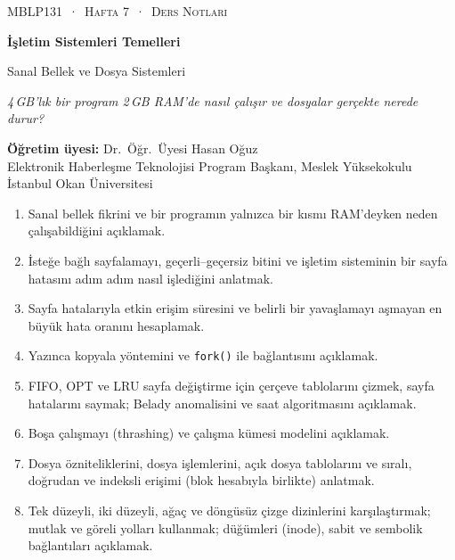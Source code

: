 \documentclass[11pt,a4paper]{article}
\newcommand{\cmd}[1]{\texttt{#1}}
\begin{document}
\thispagestyle{empty}
\begin{tcolorbox}[enhanced,colback=dark,colframe=dark,arc=0pt,boxrule=0pt,
  left=18pt,right=18pt,top=20pt,bottom=20pt,coltext=white]
{\small\color{mint}\textsc{MBLP131 \,·\, Hafta 7 \,·\, Ders Notları}}\par\medskip
{\headfont\fontsize{26}{30}\selectfont\bfseries İşletim Sistemleri Temelleri}\par\medskip
{\large Sanal Bellek ve Dosya Sistemleri}\par\smallskip
{\small\itshape\color{white!70} 4\,GB'lık bir program 2\,GB RAM'de nasıl çalışır ve dosyalar gerçekte nerede durur?}
\end{tcolorbox}

\vspace{0.4em}
\begin{minipage}[t]{0.70\linewidth}
\small
\textbf{Öğretim üyesi:} Dr.\ Öğr.\ Üyesi Hasan Oğuz\\
Elektronik Haberleşme Teknolojisi Program Başkanı, Meslek Yüksekokulu\\
İstanbul Okan Üniversitesi
\end{minipage}

\vspace{0.8em}
\begin{keyidea}
\begin{enumerate}[leftmargin=1.4em]
  \item Sanal bellek fikrini ve bir programın yalnızca bir kısmı RAM'deyken neden çalışabildiğini açıklamak.
  \item İsteğe bağlı sayfalamayı, geçerli--geçersiz bitini ve işletim sisteminin bir sayfa hatasını adım adım nasıl işlediğini anlatmak.
  \item Sayfa hatalarıyla etkin erişim süresini ve belirli bir yavaşlamayı aşmayan en büyük hata oranını hesaplamak.
  \item Yazınca kopyala yöntemini ve \cmd{fork()} ile bağlantısını açıklamak.
  \item FIFO, OPT ve LRU sayfa değiştirme için çerçeve tablolarını çizmek, sayfa hatalarını saymak; Belady anomalisini ve saat algoritmasını açıklamak.
  \item Boşa çalışmayı (thrashing) ve çalışma kümesi modelini açıklamak.
  \item Dosya özniteliklerini, dosya işlemlerini, açık dosya tablolarını ve sıralı, doğrudan ve indeksli erişimi (blok hesabıyla birlikte) anlatmak.
  \item Tek düzeyli, iki düzeyli, ağaç ve döngüsüz çizge dizinlerini karşılaştırmak; mutlak ve göreli yolları kullanmak; düğümleri (inode), sabit ve sembolik bağlantıları açıklamak.
\end{enumerate}
\end{keyidea}
\end{document}
